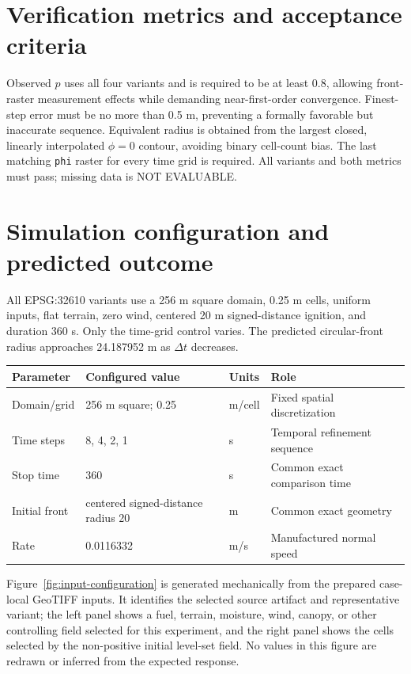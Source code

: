 \section{Verification metrics and acceptance criteria}

Observed \(p\) uses all four variants and is required to be at least 0.8, allowing front-raster measurement effects while demanding near-first-order convergence. Finest-step error must be no more than 0.5 m, preventing a formally favorable but inaccurate sequence. Equivalent radius is obtained from the largest closed, linearly interpolated \(\phi=0\) contour, avoiding binary cell-count bias. The last matching \texttt{phi} raster for every time grid is required. All variants and both metrics must pass; missing data is NOT EVALUABLE.

\section{Simulation configuration and predicted outcome}

All EPSG:32610 variants use a 256 m square domain, 0.25 m cells, uniform inputs, flat terrain, zero wind, centered 20 m signed-distance ignition, and duration 360 s. Only the time-grid control varies. The predicted circular-front radius approaches 24.187952 m as \(\Delta t\) decreases.

\begin{center}\begin{tabular}{p{}p{}p{}p{}}\toprule
Parameter & Configured value & Units & Role \\
\midrule Domain/grid & 256 m square; 0.25 & m/cell & Fixed spatial discretization \\
Time steps & 8, 4, 2, 1 & s & Temporal refinement sequence \\
Stop time & 360 & s & Common exact comparison time \\
Initial front & centered signed-distance radius 20 & m & Common exact geometry \\
Rate & 0.0116332 & m/s & Manufactured normal speed \\
\bottomrule\end{tabular}\end{center}

Figure~\ref{fig:input-configuration} is generated mechanically from the prepared case-local GeoTIFF inputs. It identifies the selected source artifact and representative variant; the left panel shows a fuel, terrain, moisture, wind, canopy, or other controlling field selected for this experiment, and the right panel shows the cells selected by the non-positive initial level-set field. No values in this figure are redrawn or inferred from the expected response.

